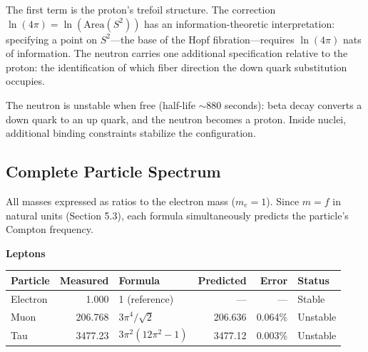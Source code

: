 \documentclass[12pt]{article}
\begin{document}
The first term is the proton's trefoil structure. The correction $\ln(4\pi) = \ln(\text{Area}(S^2))$ has an information-theoretic interpretation: specifying a point on $S^2$---the base of the Hopf fibration---requires $\ln(4\pi)$ nats of information. The neutron carries one additional specification relative to the proton: the identification of which fiber direction the down quark substitution occupies.

The neutron is unstable when free (half-life $\sim$880 seconds): beta decay converts a down quark to an up quark, and the neutron becomes a proton. Inside nuclei, additional binding constraints stabilize the configuration.

\begin{center}
\end{center}


\subsection{Complete Particle Spectrum}

All masses expressed as ratios to the electron mass ($m_e = 1$). Since $m = f$ in natural units (Section 5.3), each formula simultaneously predicts the particle's Compton frequency.

\bigskip
\textbf{Leptons}

\medskip
\begin{center}
\begin{tabular}{l r l r r l}
\toprule
\textbf{Particle} & \textbf{Measured} & \textbf{Formula} & \textbf{Predicted} & \textbf{Error} & \textbf{Status} \\
\midrule
Electron & 1.000 & 1 (reference) & --- & --- & Stable \\
Muon & 206.768 & $3\pi^4/\sqrt{2}$ & 206.636 & 0.064\% & Unstable \\
Tau & 3477.23 & $3\pi^2(12\pi^2 - 1)$ & 3477.12 & 0.003\% & Unstable \\
\bottomrule
\end{tabular}
\end{center}
\end{document}
